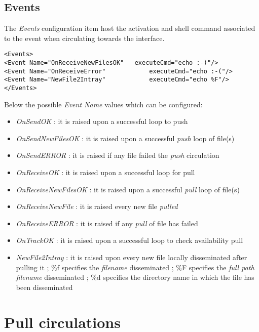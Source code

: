 \documentclass[dec_sum_main.tex]{subfiles}
\begin{document}
\subsection{Events}
The \textit{Events} configuration item host the activation and shell command associated to the event when circulating towards the interface.
\begin{lstlisting}
<Events>
<Event Name="OnReceiveNewFilesOK"  	executeCmd="echo :-)"/>
<Event Name="OnReceiveError"            executeCmd="echo :-("/>
<Event Name="NewFile2Intray"            executeCmd="echo %F"/>
</Events>
\end{lstlisting}
\par
\par
\noindent
Below the possible \textit{Event Name} values which can be configured:
\begin{itemize}
	\item \textit{OnSendOK} : it is raised upon a successful loop to push
	\item \textit{OnSendNewFilesOK} : it is raised upon a successful \textit{push} loop of file(s)
	\item \textit{OnSendERROR} : it is raised if any file failed the \textit{push} circulation 
	\item \textit{OnReceiveOK} : it is raised upon a successful loop for pull
	\item \textit{OnReceiveNewFilesOK} : it is raised upon a successful \textit{pull} loop of file(s)
	\item \textit{OnReceiveNewFile} : it is raised every new file \textit{pulled}
	\item \textit{OnReceiveERROR} : it is raised if any \textit{pull} of file has failed
	\item \textit{OnTrackOK} : it is raised upon a successful loop to check availability pull
	\item \textit{NewFile2Intray} :	it is raised upon every new file locally disseminated after pulling it ; \%f specifies the \textit{filename} disseminated ; \%F specifies the \textit{full path filename} disseminated ; \%d specifies the directory name in which the file has been disseminated 					 
\end{itemize}


\newpage
\section{Pull circulations}
\end{document}
